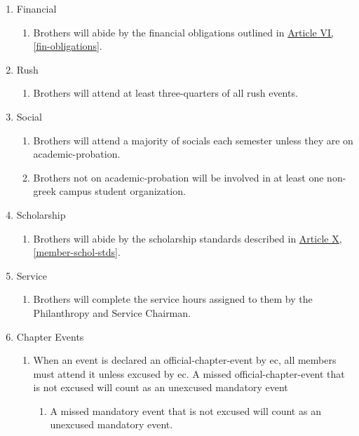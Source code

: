 	\begin{enumerate}
		\item Financial
			\begin{enumerate}
				\item Brothers will abide by the financial obligations outlined in \hyperref[fin-obligations]{Article VI, \autoref*{fin-obligations}}. 
			\end{enumerate}

		\item Rush
			\begin{enumerate}
				\label{rush-attend-std}
				\item Brothers will \gls{attend} at least three-quarters of all rush events.
			\end{enumerate}

		\item Social
			\begin{enumerate}
				\item Brothers will \gls{attend} a majority of \glspl{social} each semester unless they are on \gls{academic-probation}. 
				\item Brothers not on \gls{academic-probation} will be involved in at least one non-greek campus student organization.
			\end{enumerate}

	\item Scholarship
		\begin{enumerate}
			\item Brothers will abide by the scholarship standards described in \hyperref[member-schol-stds]{Article X, \autoref*{member-schol-stds}}. 
		\end{enumerate}
	
	\item Service
		\begin{enumerate}
			\item Brothers will complete the service hours assigned to them by the Philanthropy and Service Chairman.
		\end{enumerate}

	\item Chapter Events
		\begin{enumerate}
			\item When an event is declared an \gls{official-chapter-event} by \gls{ec}, all members must \gls{attend} it unless excused by \gls{ec}. A missed \gls{official-chapter-event} that is not excused will count as an unexcused mandatory event
				\begin{enumerate}
					\item A missed mandatory event that is not excused will count as an unexcused mandatory event.


\end{enumerate}
\end{enumerate}
\end{enumerate}
